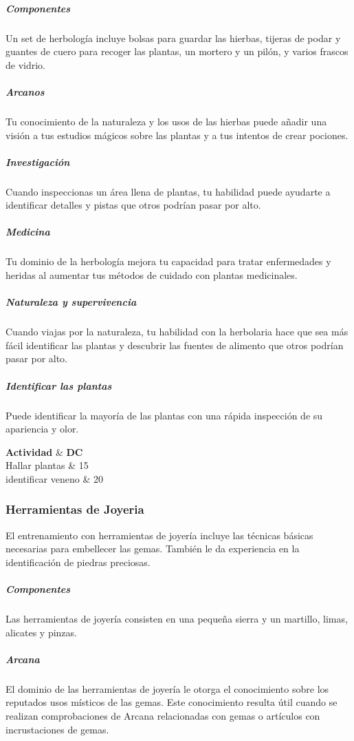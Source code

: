 \documentclass[a4paper,twocolumn,openany,10pt]{dndbook}
\begin{document}
\subparagraph{Componentes} Un set de herbología incluye bolsas para guardar las hierbas, tijeras de podar y guantes de cuero para
recoger las plantas, un mortero y un pilón, y varios frascos de vidrio.

\subparagraph{Arcanos} Tu conocimiento de la naturaleza y los usos de las hierbas puede añadir una visión a tus estudios mágicos
sobre las plantas y a tus intentos de crear pociones.

\subparagraph{Investigación} Cuando inspeccionas un área llena de plantas, tu habilidad puede ayudarte a identificar detalles y
pistas que otros podrían pasar por alto.

\subparagraph{Medicina} Tu dominio de la herbología mejora tu capacidad para tratar enfermedades y heridas al aumentar tus
métodos de cuidado con plantas medicinales.

\subparagraph{Naturaleza y supervivencia} Cuando viajas por la naturaleza, tu habilidad con la herbolaria hace que sea más fácil
identificar las plantas y descubrir las fuentes de alimento que otros podrían pasar por alto.

\subparagraph{Identificar las plantas} Puede identificar la mayoría de las plantas con una rápida inspección de su apariencia y
olor. 

\begin{dndtable}[Xc]
	\textbf{Actividad}		& \textbf{DC}	\\
	Hallar plantas			& 15	\\
	identificar veneno		& 20	\\
\end{dndtable}

\subsubsection*{Herramientas de Joyeria}
El entrenamiento con herramientas de joyería incluye las técnicas básicas necesarias para embellecer las gemas. También le da
experiencia en la identificación de piedras preciosas.

\subparagraph{Componentes} Las herramientas de joyería consisten en una pequeña sierra y un martillo, limas, alicates y pinzas.

\subparagraph{Arcana} El dominio de las herramientas de joyería le otorga el conocimiento sobre los reputados usos místicos de
las gemas. Este conocimiento resulta útil cuando se realizan comprobaciones de Arcana relacionadas con gemas o artículos con
incrustaciones de gemas.
\end{document}
